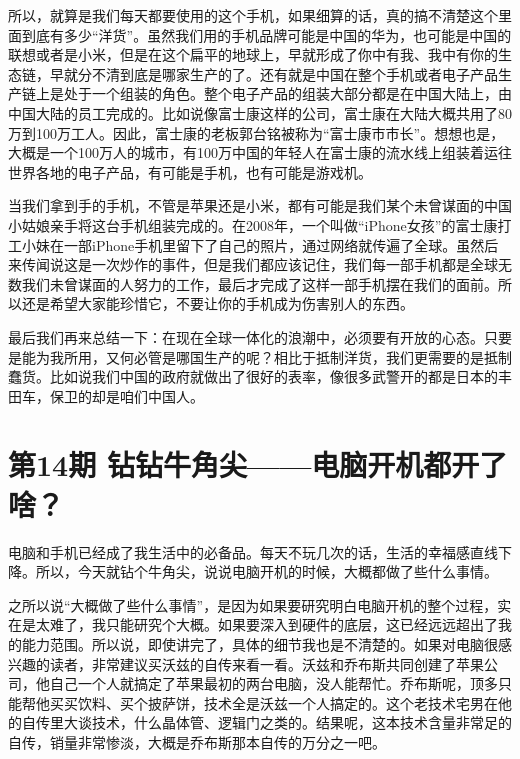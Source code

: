 \documentclass[
  letterpaper,
  DIV=11,
  numbers=noendperiod]{scrreprt}
\begin{document}
所以，就算是我们每天都要使用的这个手机，如果细算的话，真的搞不清楚这个里面到底有多少``洋货''。虽然我们用的手机品牌可能是中国的华为，也可能是中国的联想或者是小米，但是在这个扁平的地球上，早就形成了你中有我、我中有你的生态链，早就分不清到底是哪家生产的了。还有就是中国在整个手机或者电子产品生产链上是处于一个组装的角色。整个电子产品的组装大部分都是在中国大陆上，由中国大陆的员工完成的。比如说像富士康这样的公司，富士康在大陆大概共用了80万到100万工人。因此，富士康的老板郭台铭被称为``富士康市市长''。想想也是，大概是一个100万人的城市，有100万中国的年轻人在富士康的流水线上组装着运往世界各地的电子产品，有可能是手机，也有可能是游戏机。

当我们拿到手的手机，不管是苹果还是小米，都有可能是我们某个未曾谋面的中国小姑娘亲手将这台手机组装完成的。在2008年，一个叫做``iPhone女孩''的富士康打工小妹在一部iPhone手机里留下了自己的照片，通过网络就传遍了全球。虽然后来传闻说这是一次炒作的事件，但是我们都应该记住，我们每一部手机都是全球无数我们未曾谋面的人努力的工作，最后才完成了这样一部手机摆在我们的面前。所以还是希望大家能珍惜它，不要让你的手机成为伤害别人的东西。

最后我们再来总结一下：在现在全球一体化的浪潮中，必须要有开放的心态。只要是能为我所用，又何必管是哪国生产的呢？相比于抵制洋货，我们更需要的是抵制蠢货。比如说我们中国的政府就做出了很好的表率，像很多武警开的都是日本的丰田车，保卫的却是咱们中国人。


\chapter{第14期
钻钻牛角尖------电脑开机都开了啥？}\label{ux7b2c14ux671f-ux94bbux94bbux725bux89d2ux5c16ux7535ux8111ux5f00ux673aux90fdux5f00ux4e86ux5565}

电脑和手机已经成了我生活中的必备品。每天不玩几次的话，生活的幸福感直线下降。所以，今天就钻个牛角尖，说说电脑开机的时候，大概都做了些什么事情。

之所以说``大概做了些什么事情''，是因为如果要研究明白电脑开机的整个过程，实在是太难了，我只能研究个大概。如果要深入到硬件的底层，这已经远远超出了我的能力范围。所以说，即使讲完了，具体的细节我也是不清楚的。如果对电脑很感兴趣的读者，非常建议买沃兹的自传来看一看。沃兹和乔布斯共同创建了苹果公司，他自己一个人就搞定了苹果最初的两台电脑，没人能帮忙。乔布斯呢，顶多只能帮他买买饮料、买个披萨饼，技术全是沃兹一个人搞定的。这个老技术宅男在他的自传里大谈技术，什么晶体管、逻辑门之类的。结果呢，这本技术含量非常足的自传，销量非常惨淡，大概是乔布斯那本自传的万分之一吧。
\end{document}
